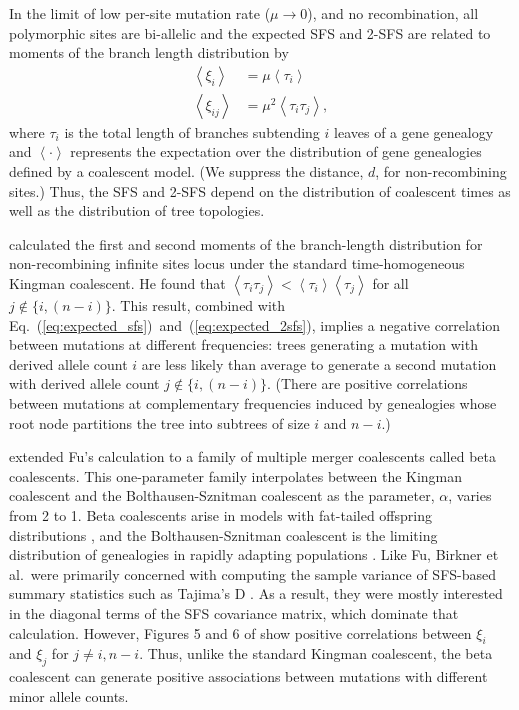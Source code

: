 \documentclass[11pt, letterpaper]{article}   	%
\newcommand{\eqs}[2]{Eq.~(\ref{#1})~and~(\ref{#2})}
\newcommand{\E}[1]{\left< #1 \right>}
\begin{document}
In the limit of low per-site mutation rate ($\mu\to0$), and no recombination, all polymorphic sites are bi-allelic and the expected SFS and 2-SFS are related to moments of the branch length distribution by
\begin{align}
    \E{\xi_i} &= \mu \E{\tau_i} \label{eq:expected_sfs} \\
    \E{\xi_{ij}} &= \mu^2 \E{\tau_i \tau_j},
    \label{eq:expected_2sfs}
\end{align}
where $\tau_i$ is the total length of branches subtending $i$ leaves of a gene genealogy and $\E{\cdot}$ represents the expectation over the distribution of gene genealogies defined by a coalescent model.
(We suppress the distance, $d$, for non-recombining sites.)
Thus, the SFS and 2-SFS depend on the distribution of coalescent times as well as the distribution of tree topologies.

\cite{Fu1995} calculated the first and second moments of the branch-length distribution for non-recombining infinite sites locus under the standard time-homogeneous Kingman coalescent.
He found that $\E{\tau_i \tau_j} < \E{\tau_i}\E{\tau_j}$ for all $j \not\in \{i, (n-i)\}$.
This result, combined with \eqs{eq:expected_sfs}{eq:expected_2sfs}, implies a negative correlation between mutations at different frequencies: trees generating a mutation with derived allele count $i$ are less likely than average to generate a second mutation with derived allele count $j \not\in \{i, (n-i)\}$.
(There are positive correlations between mutations at complementary frequencies induced by genealogies whose root node partitions the tree into subtrees of size $i$ and $n-i$.)

\cite{BirknerEtAl2013} extended Fu's calculation to a family of multiple merger coalescents called beta coalescents.
This one-parameter family interpolates between the Kingman coalescent and the Bolthausen-Sznitman coalescent as the parameter, $\alpha$, varies from 2 to 1.
Beta coalescents arise in models with fat-tailed offspring distributions \autocite{Schweinsberg2003}, and the Bolthausen-Sznitman coalescent is the limiting distribution of genealogies in rapidly adapting populations \autocite{NeherHallatscheck2013}.
Like Fu, Birkner et al.\ were primarily concerned with computing the sample variance of SFS-based summary statistics such as Tajima's D \autocite{Tajima1989}.
As a result, they were mostly interested in the diagonal terms of the SFS covariance matrix, which dominate that calculation.
However, Figures 5 and 6 of \cite{BirknerEtAl2013} show positive correlations between $\xi_i$ and $\xi_j$ for $j \neq i, n-i$.
Thus, unlike the standard Kingman coalescent, the beta coalescent can generate positive associations between mutations with different minor allele counts.
\end{document}
